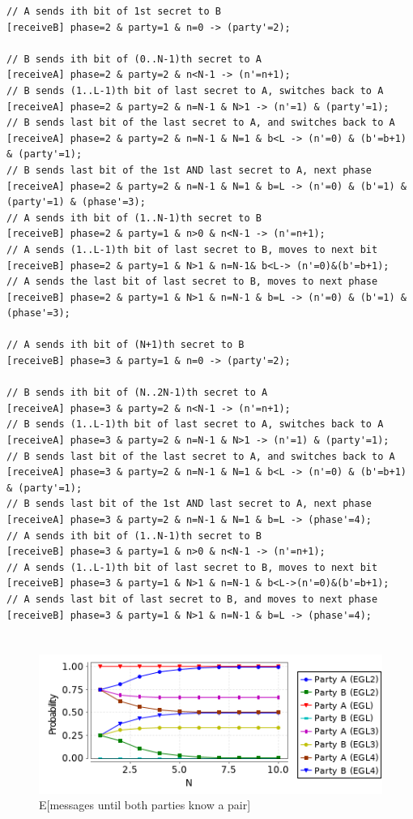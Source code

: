 \documentclass[12pt]{article}
\begin{document}
\begin{lstlisting}[caption=EGL4 Changes]
// A sends ith bit of 1st secret to B
[receiveB] phase=2 & party=1 & n=0 -> (party'=2);

// B sends ith bit of (0..N-1)th secret to A
[receiveA] phase=2 & party=2 & n<N-1 -> (n'=n+1);
// B sends (1..L-1)th bit of last secret to A, switches back to A
[receiveA] phase=2 & party=2 & n=N-1 & N>1 -> (n'=1) & (party'=1);
// B sends last bit of the last secret to A, and switches back to A
[receiveA] phase=2 & party=2 & n=N-1 & N=1 & b<L -> (n'=0) & (b'=b+1) & (party'=1);
// B sends last bit of the 1st AND last secret to A, next phase
[receiveA] phase=2 & party=2 & n=N-1 & N=1 & b=L -> (n'=0) & (b'=1) & (party'=1) & (phase'=3);
// A sends ith bit of (1..N-1)th secret to B
[receiveB] phase=2 & party=1 & n>0 & n<N-1 -> (n'=n+1);
// A sends (1..L-1)th bit of last secret to B, moves to next bit
[receiveB] phase=2 & party=1 & N>1 & n=N-1& b<L-> (n'=0)&(b'=b+1);
// A sends the last bit of last secret to B, moves to next phase
[receiveB] phase=2 & party=1 & N>1 & n=N-1 & b=L -> (n'=0) & (b'=1) & (phase'=3);

// A sends ith bit of (N+1)th secret to B
[receiveB] phase=3 & party=1 & n=0 -> (party'=2);

// B sends ith bit of (N..2N-1)th secret to A
[receiveA] phase=3 & party=2 & n<N-1 -> (n'=n+1);
// B sends (1..L-1)th bit of last secret to A, switches back to A
[receiveA] phase=3 & party=2 & n=N-1 & N>1 -> (n'=1) & (party'=1);
// B sends last bit of the last secret to A, and switches back to A
[receiveA] phase=3 & party=2 & n=N-1 & N=1 & b<L -> (n'=0) & (b'=b+1) & (party'=1);
// B sends last bit of the 1st AND last secret to A, next phase
[receiveA] phase=3 & party=2 & n=N-1 & N=1 & b=L -> (phase'=4);
// A sends ith bit of (1..N-1)th secret to B
[receiveB] phase=3 & party=1 & n>0 & n<N-1 -> (n'=n+1);
// A sends (1..L-1)th bit of last secret to B, moves to next bit
[receiveB] phase=3 & party=1 & N>1 & n=N-1 & b<L->(n'=0)&(b'=b+1);
// A sends last bit of last secret to B, and moves to next phase
[receiveB] phase=3 & party=1 & N>1 & n=N-1 & b=L -> (phase'=4);
\end{lstlisting}

\section{}

\begin{figure}[H]
  \caption{E[messages until both parties know a pair]}
  \centering
    \includegraphics[width=1\textwidth]{egl1234_prob_party_disadvantaged.png}
\end{figure}
\end{document}
